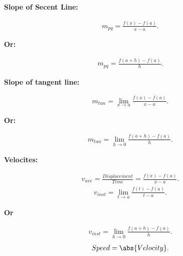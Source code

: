 \documentclass{report}
\begin{document}
        \bigbreak \noindent \bigbreak \noindent 
        \begin{large}
            \textbf{Slope of Secent Line:}
        \end{large}

        \bigbreak \noindent \bigbreak \noindent
        \begin{align*}
            m_{pq} = \frac{f(x) - f(a)}{x-a}
        .\end{align*}
        \bigbreak \noindent 
        \begin{center}
            \textbf{Or:}
        \end{center}
        \begin{align*}
            m_{pq} = \frac{f(a+h) - f(a)}{h} 
        .\end{align*}

        \bigbreak \noindent \bigbreak \noindent \bigbreak \noindent 
        \begin{large}
            \textbf{Slope of tangent line:}
        \end{large}

        \bigbreak \noindent \bigbreak \noindent 
        \begin{align*}
            m_{tan} = \lim\limits_{x \to a}{ \frac{f(x) - f(a)}{x-a}}
        .\end{align*}
        \bigbreak \noindent 
        \begin{center}
            \textbf{Or:}
        \end{center}
        \begin{align*}
            m_{tan} = \lim\limits_{h \to 0}{ \frac{f(a+h) - f(a)}{h}}
        .\end{align*}

        \bigbreak \noindent \bigbreak \noindent \bigbreak \noindent 
        \begin{large}
            \textbf{Velocites:}
        \end{large}
        \bigbreak \noindent \bigbreak \noindent 
        \begin{align*}
            v_{ave} = \frac{Displacement}{Time} = \frac{f(x) - f(a)}{x-a}
        .\end{align*}
        \bigbreak \noindent
        \begin{align*}
            v_{inst} = \lim\limits_{t \to a}{ \frac{f(t) - f(a)}{t-a}}
        .\end{align*}
        \bigbreak \noindent 
        \begin{center}
            \textbf{Or}
        \end{center}
        \begin{align*}
            v_{inst} = \lim\limits_{h \to 0}{ \frac{f(a+h) - f(a)}{h}}
        .\end{align*}
        \bigbreak \noindent 
        \begin{align*}
            Speed = \abs{Velocity}
        .\end{align*}
\end{document}
